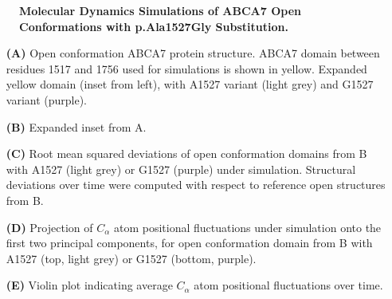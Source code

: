 \begin{figure}[H]
\begin{subfigure}[t]{.5\textwidth}
    \end{subfigure}
    \caption{
        \textbf{Molecular Dynamics Simulations of ABCA7 Open Conformations with p.Ala1527Gly Substitution.}\\
    }
    \label{fig:md_simulations}
\end{figure}
\begin{itemize}
    \item[\textbf{(A)}] Open conformation ABCA7 protein structure. ABCA7 domain between residues 1517 and 1756 used for simulations is shown in yellow. Expanded yellow domain (inset from left), with A1527 variant (light grey) and G1527 variant (purple). 
    \item[\textbf{(B)}] Expanded inset from A. 
    \item[\textbf{(C)}] Root mean squared deviations of open conformation domains from B with A1527 (light grey) or G1527 (purple) under simulation. Structural deviations over time were computed with respect to reference open structures from B. 
    \item[\textbf{(D)}] Projection of $C_\alpha$ atom positional fluctuations under simulation onto the first two principal components, for open conformation domain from B with A1527 (top, light grey) or G1527 (bottom, purple). 
    \item[\textbf{(E)}] Violin plot indicating average $C_\alpha$ atom positional fluctuations over time. 
\end{itemize}